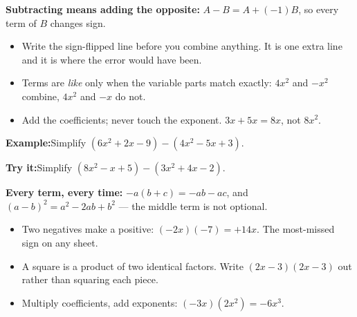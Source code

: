 \documentclass[12pt]{article}
\begin{document}


\begin{formulabox}
\textbf{Subtracting means adding the opposite:} $A - B = A + (-1)B$, so every term of $B$ changes sign.
\begin{itemize}[leftmargin=0.8cm, itemsep=0pt, topsep=1pt]
  \item Write the sign-flipped line before you combine anything. It is one extra line and it is where the error would have been.
  \item Terms are \emph{like} only when the variable parts match exactly: $4x^2$ and $-x^2$ combine, $4x^2$ and $-x$ do not.
  \item Add the coefficients; never touch the exponent. $3x + 5x = 8x$, not $8x^2$.
\end{itemize}
\end{formulabox}

\begin{examplebox}
\textbf{Example:}\quad Simplify $(6x^2 + 2x - 9) - (4x^2 - 5x + 3)$.
\end{examplebox}

\begin{tryitbox}
\textbf{Try it:}\quad Simplify $(8x^2 - x + 5) - (3x^2 + 4x - 2)$.\\[2pt]
\end{tryitbox}


\begin{formulabox}
\textbf{Every term, every time:} $-a(b + c) = -ab - ac$, and $(a - b)^2 = a^2 - 2ab + b^2$ --- the middle term is not optional.
\begin{itemize}[leftmargin=0.8cm, itemsep=0pt, topsep=1pt]
  \item Two negatives make a positive: $(-2x)(-7) = +14x$. The most-missed sign on any sheet.
  \item A square is a product of two identical factors. Write $(2x-3)(2x-3)$ out rather than squaring each piece.
  \item Multiply coefficients, add exponents: $(-3x)(2x^2) = -6x^3$.
\end{itemize}
\end{formulabox}
\end{document}
